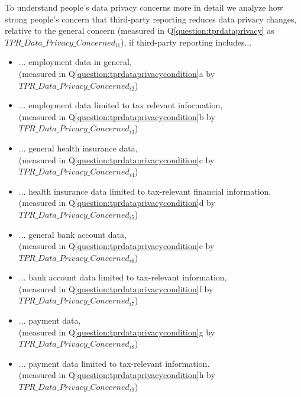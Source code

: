 \documentclass[11pt]{article}
\begin{document}
To understand people's data privacy concerns more in detail we analyze how strong people's concern that third-party reporting reduces data privacy changes, relative to the general concern (measured in Q\ref{question:tprdataprivacy} as $TPR\_Data\_Privacy\_Concerned_{i1}$),  if third-party reporting includes...
\begin{itemize}
    \item ... employment data in general, \\(measured in Q\ref{question:tprdataprivacycondition}a by $TPR\_Data\_Privacy\_Concerned_{i2}$)
    \item ... employment data limited to tax relevant information, \\(measured in Q\ref{question:tprdataprivacycondition}b by $TPR\_Data\_Privacy\_Concerned_{i3}$)
    \item ... general health insurance data, \\(measured in Q\ref{question:tprdataprivacycondition}c by $TPR\_Data\_Privacy\_Concerned_{i4}$)
    \item ... health insurance data limited to tax-relevant financial information, \\(measured in Q\ref{question:tprdataprivacycondition}d by $TPR\_Data\_Privacy\_Concerned_{i5}$)
    \item ... general bank account data, \\(measured in Q\ref{question:tprdataprivacycondition}e by $TPR\_Data\_Privacy\_Concerned_{i6}$)
    \item ... bank account data limited to tax-relevant information, \\(measured in Q\ref{question:tprdataprivacycondition}f by $TPR\_Data\_Privacy\_Concerned_{i7}$)
    \item ... payment data, \\(measured in Q\ref{question:tprdataprivacycondition}g by $TPR\_Data\_Privacy\_Concerned_{i8}$)
    \item ... payment data limited to tax-relevant information. \\(measured in Q\ref{question:tprdataprivacycondition}h by $TPR\_Data\_Privacy\_Concerned_{i9}$)
\end{itemize}
\end{document}
